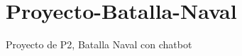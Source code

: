 \chapter{Proyecto-\/\+Batalla-\/\+Naval}
\hypertarget{md__r_e_a_d_m_e}{}\label{md__r_e_a_d_m_e}
\label{md__r_e_a_d_m_e_autotoc_md0}%
%
Proyecto de P2, Batalla Naval con chatbot 